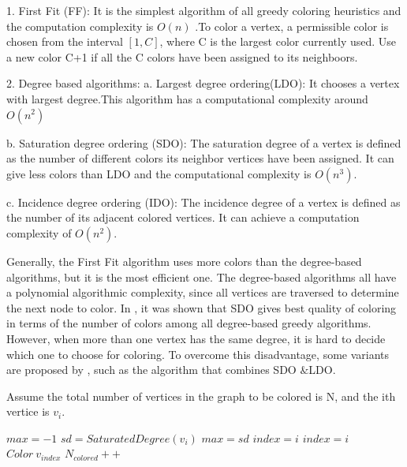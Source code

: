 \documentclass[preprint]{sigplanconf}
\begin{document}
1. First Fit (FF): It is the simplest algorithm of all greedy coloring heuristics and the computation complexity is $O(n)$ \cite{klotz2002graph}.To color a vertex, a permissible color is chosen from the interval $[1,C]$, where C is the largest color currently used. Use a new color C+1 if all the C colors have been assigned to its neighboors.

2. Degree based algorithms:
a. Largest degree ordering(LDO):  It chooses a  vertex with largest degree.This algorithm has a computational complexity around $O(n^2)$ \cite{klotz2002graph}

b. Saturation degree ordering (SDO): The saturation degree of a vertex is defined  as the number of different colors its neighbor vertices have been assigned. It can give less colors than LDO and the computational complexity is $O(n^3)$\cite{klotz2002graph}.

c. Incidence degree ordering (IDO): The incidence degree of a vertex is defined as the number of its adjacent colored vertices. It can achieve a computation complexity of $O(n^2)$\cite{klotz2002graph}.

Generally, the First Fit algorithm uses more colors than the degree-based algorithms, but it is the most efficient one. The degree-based algorithms all have a polynomial algorithmic complexity, since all vertices are traversed to determine the next node to color.  In \cite{gebremedhin1999parallel}, it was shown that SDO gives best quality of coloring in terms of  the number of colors among all degree-based greedy algorithms.   However, when more than one vertex has the same degree, it is hard to decide which one to choose for coloring.  To overcome this disadvantage,  some variants are proposed by  \cite{al2006new}, such as the algorithm that combines SDO $\& $LDO.

\renewcommand{\algorithmicrequire}{\textbf{phase}}
Assume the total number of vertices in the graph to be colored is N,
and the ith vertice is $v_i$.
\begin{algorithm}
\begin{algorithmic}
    \STATE  $ max = -1$
           \STATE $sd = SaturatedDegree(v_i) $
               \STATE $max = sd$
               \STATE $index = i$
           \ENDIF
                 \STATE $index = i$
             \ENDIF
           \ENDIF
        \STATE $ Color \:v_{index} $
        \STATE $N_{colored} ++$
        \ENDIF
    \ENDFOR
\ENDWHILE
\end{algorithmic}
\end{algorithm}
\end{document}
